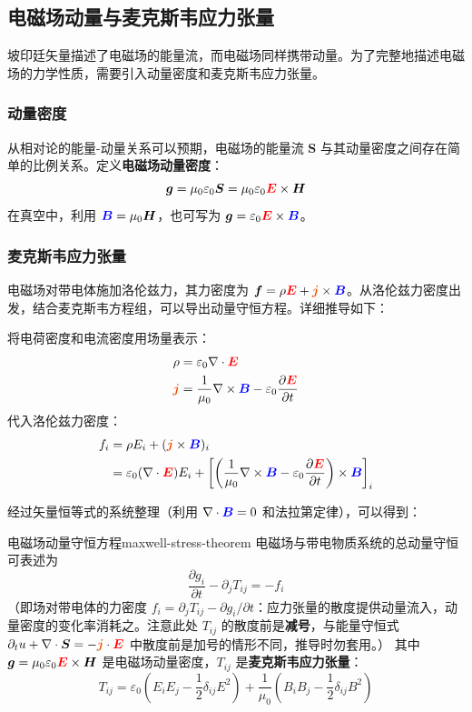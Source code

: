 \documentclass[11pt,a4paper,openany,oneside]{book}
\newcommand{\vecE}{\textcolor{red}{\vect{E}}}
\newcommand{\vecB}{\textcolor{blue}{\vect{B}}}
\newcommand{\vecJ}{\textcolor{cororange}{\vect{j}}}
\newcommand{\eps}{\varepsilon}
\newcommand{\muz}{\mu_0}
\newcommand{\vect}[1]{\bm{#1}}
\newcommand{\curl}{\nabla\times}
\newcommand{\divg}{\nabla\cdot}
\begin{document}
\subsection{电磁场动量与麦克斯韦应力张量}

坡印廷矢量描述了电磁场的能量流，而电磁场同样携带动量。为了完整地描述电磁场的力学性质，需要引入动量密度和麦克斯韦应力张量。

\subsubsection{动量密度}

从相对论的能量-动量关系可以预期，电磁场的能量流 $\vect{S}$ 与其动量密度之间存在简单的比例关系。定义\textbf{电磁场动量密度}：
\[
\vect{g} = \muz\eps_0\vect{S} = \muz\eps_0\vecE\times\vect{H}
\]
在真空中，利用 $\vecB = \muz\vect{H}$，也可写为 $\vect{g} = \eps_0\vecE\times\vecB$。

\subsubsection{麦克斯韦应力张量}

电磁场对带电体施加洛伦兹力，其力密度为 $\vect{f} = \rho\vecE + \vecJ\times\vecB$。从洛伦兹力密度出发，结合麦克斯韦方程组，可以导出动量守恒方程。详细推导如下：

将电荷密度和电流密度用场量表示：
\begin{align*}
\rho &= \eps_0\nabla\cdot\vecE \\
\vecJ &= \frac{1}{\muz}\curl\vecB - \eps_0\frac{\partial\vecE}{\partial t}
\end{align*}
代入洛伦兹力密度：
\begin{align*}
f_i &= \rho E_i + (\vecJ\times\vecB)_i \\
&= \eps_0(\nabla\cdot\vecE)E_i + \left[\left(\frac{1}{\muz}\curl\vecB - \eps_0\frac{\partial\vecE}{\partial t}\right)\times\vecB\right]_i
\end{align*}

经过矢量恒等式的系统整理（利用 $\divg\vecB=0$ 和法拉第定律），可以得到：
\begin{theorem}{电磁场动量守恒方程}{maxwell-stress-theorem}
电磁场与带电物质系统的总动量守恒可表述为
\[
\frac{\partial g_i}{\partial t} - \partial_j T_{ij} = -f_i
\]
（即场对带电体的力密度 $f_i = \partial_j T_{ij} - \partial g_i/\partial t$：应力张量的散度提供动量流入，动量密度的变化率消耗之。注意此处 $T_{ij}$ 的散度前是\textbf{减号}，与能量守恒式 $\partial_t u + \divg\vect{S} = -\vecJ\cdot\vecE$ 中散度前是加号的情形不同，推导时勿套用。）
其中 $\vect{g} = \muz\eps_0\vecE\times\vect{H}$ 是电磁场动量密度，$T_{ij}$ 是\textbf{麦克斯韦应力张量}：
\[
T_{ij} = \eps_0\left(E_i E_j - \frac{1}{2}\delta_{ij}E^2\right) + \frac{1}{\muz}\left(B_i B_j - \frac{1}{2}\delta_{ij}B^2\right)
\]
\end{theorem}
\end{document}
